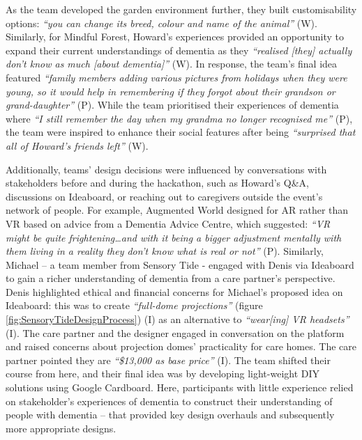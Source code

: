 As the team developed the garden environment further, they built customisability options: \textit{``you can change its breed, colour and name of the animal''} (W). Similarly, for Mindful Forest, Howard’s experiences provided an opportunity to expand their current understandings of dementia as they \textit{``realised [they] actually don’t know as much [about dementia]''} (W). In response, the team’s final idea featured \textit{``family members adding various pictures from holidays when they were young, so it would help in remembering if they forgot about their grandson or grand-daughter''} (P). While the team prioritised their experiences of dementia where \textit{``I still remember the day when my grandma no longer recognised me''} (P), the team were inspired to enhance their social features after being \textit{``surprised that all of Howard’s friends left''} (W). 

Additionally, teams’ design decisions were influenced by conversations with stakeholders before and during the hackathon, such as Howard’s Q\&A, discussions on Ideaboard, or reaching out to caregivers outside the event’s network of people. For example, Augmented World designed for AR rather than VR based on advice from a Dementia Advice Centre, which suggested: \textit{``VR might be quite frightening…and with it being a bigger adjustment mentally with them living in a reality they don’t know what is real or not''} (P). Similarly, Michael – a team member from Sensory Tide - engaged with Denis via Ideaboard to gain a richer understanding of dementia from a care partner’s perspective. Denis highlighted ethical and financial concerns for Michael’s proposed idea on Ideaboard: this was to create \textit{``full-dome projections''} (figure \ref{fig:SensoryTideDesignProcess}) (I) as an alternative to \textit{``wear[ing] VR headsets''} (I). The care partner and the designer engaged in conversation on the platform and raised concerns about projection domes’ practicality for care homes. The care partner pointed they are \textit{``\$13,000 as base price''} (I). The team shifted their course from here, and their final idea was by developing light-weight DIY solutions using Google Cardboard. Here, participants with little experience relied on stakeholder’s experiences of dementia to construct their understanding of people with dementia – that provided key design overhauls and subsequently more appropriate designs.

